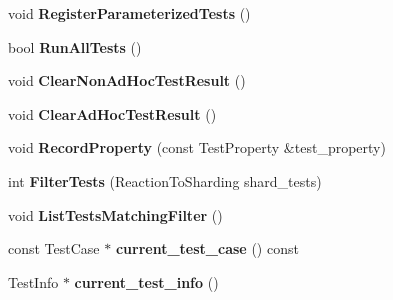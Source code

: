 \begin{DoxyCompactItemize}
\item 
\hypertarget{classtesting_1_1internal_1_1UnitTestImpl_af84d2515f1a272a8783f00a3e8c0aff8}{void {\bfseries Register\-Parameterized\-Tests} ()}\label{classtesting_1_1internal_1_1UnitTestImpl_af84d2515f1a272a8783f00a3e8c0aff8}

\item 
\hypertarget{classtesting_1_1internal_1_1UnitTestImpl_a1fb6be9971f4768c4136a05aa9e7e375}{bool {\bfseries Run\-All\-Tests} ()}\label{classtesting_1_1internal_1_1UnitTestImpl_a1fb6be9971f4768c4136a05aa9e7e375}

\item 
\hypertarget{classtesting_1_1internal_1_1UnitTestImpl_a96c2a5b23541ef01020c402644563ba1}{void {\bfseries Clear\-Non\-Ad\-Hoc\-Test\-Result} ()}\label{classtesting_1_1internal_1_1UnitTestImpl_a96c2a5b23541ef01020c402644563ba1}

\item 
\hypertarget{classtesting_1_1internal_1_1UnitTestImpl_ac44629cc4fa12b788779d4aa76939510}{void {\bfseries Clear\-Ad\-Hoc\-Test\-Result} ()}\label{classtesting_1_1internal_1_1UnitTestImpl_ac44629cc4fa12b788779d4aa76939510}

\item 
\hypertarget{classtesting_1_1internal_1_1UnitTestImpl_a15e4af4df167d2504decbc8fcc108a6f}{void {\bfseries Record\-Property} (const Test\-Property \&test\-\_\-property)}\label{classtesting_1_1internal_1_1UnitTestImpl_a15e4af4df167d2504decbc8fcc108a6f}

\item 
\hypertarget{classtesting_1_1internal_1_1UnitTestImpl_abd47e447f0c2557ed528db0350671bed}{int {\bfseries Filter\-Tests} (Reaction\-To\-Sharding shard\-\_\-tests)}\label{classtesting_1_1internal_1_1UnitTestImpl_abd47e447f0c2557ed528db0350671bed}

\item 
\hypertarget{classtesting_1_1internal_1_1UnitTestImpl_ad2cfedef41d3d29aad23c2c64214e6f3}{void {\bfseries List\-Tests\-Matching\-Filter} ()}\label{classtesting_1_1internal_1_1UnitTestImpl_ad2cfedef41d3d29aad23c2c64214e6f3}

\item 
\hypertarget{classtesting_1_1internal_1_1UnitTestImpl_a2f44db2fb6d9cf3d0c2a90d9efc87402}{const Test\-Case $\ast$ {\bfseries current\-\_\-test\-\_\-case} () const }\label{classtesting_1_1internal_1_1UnitTestImpl_a2f44db2fb6d9cf3d0c2a90d9efc87402}

\item 
\hypertarget{classtesting_1_1internal_1_1UnitTestImpl_a8d303ebdcf5989e96d3ed96fb7255102}{Test\-Info $\ast$ {\bfseries current\-\_\-test\-\_\-info} ()}\label{classtesting_1_1internal_1_1UnitTestImpl_a8d303ebdcf5989e96d3ed96fb7255102}


\end{DoxyCompactItemize}
